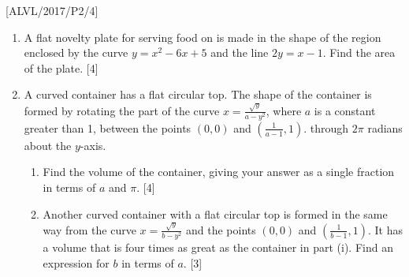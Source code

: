 \item {[}ALVL/2017/P2/4{]}
\begin{enumerate}
\item A flat novelty plate for serving food on is made in the shape of the
region enclosed by the curve $y=x^{2}-6x+5$ and the line $2y=x-1$.
Find the area of the plate. \hfill{}{[}4{]} 
\item A curved container has a flat circular top. The shape of the container
is formed by rotating the part of the curve $x=\frac{\sqrt{y}}{a-y^{2}}$,
where $a$ is a constant greater than 1, between the points $\left(0,0\right)$
and $\left(\frac{1}{a-1},1\right)$. through $2\pi$ radians about
the $y$-axis. 
\begin{enumerate}
\item Find the volume of the container, giving your answer as a single fraction
in terms of $a$ and $\pi$.\hfill{} {[}4{]} 
\item Another curved container with a flat circular top is formed in the
same way from the curve $x=\frac{\sqrt{y}}{b-y^{2}}$ and the points
$\left(0,0\right)$ and $\left(\frac{1}{b-1},1\right)$. It has a
volume that is four times as great as the container in part (i). Find
an expression for $b$ in terms of $a$. \hfill{}{[}3{]} 
\end{enumerate}
\end{enumerate}
